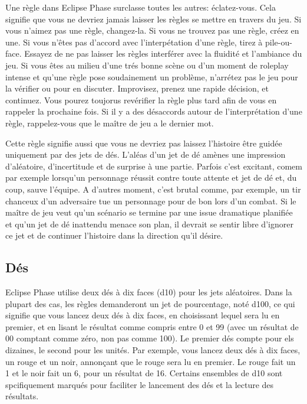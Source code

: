 Une règle dans Eclipse Phase surclasse toutes les autres: éclatez-vous. Cela signifie que vous ne devriez jamais laisser les règles se mettre en travers du jeu. Si vous n'aimez pas une règle, changez-la. Si vous ne trouvez pas une règle, créez en une. Si vous n'êtes pas d'accord avec l'interpétation d'une règle, tirez à pile-ou-face. Essayez de ne pas laisser les règles interférer avec la fluidité et l'ambiance du jeu. Si vous êtes au milieu d'une trés bonne scène ou d'un moment de roleplay intense et qu'une règle pose soudainement un problème, n'arrétez pas le jeu pour la vérifier ou pour en discuter. Improvisez, prenez une rapide décision, et continuez. Vous pourez toujorus revérifier la règle plus tard afin de vous en rappeler la prochaine fois. Si il y a des désaccords autour de l'interprétation d'une règle, rappelez-vous que le maître de jeu a le dernier mot. 

Cette règle signifie aussi que vous ne devriez pas laissez l'histoire être guidée uniquement par des jets de dés. L'aléas d'un jet de dé amènes une impression d'aléatoire, d'incertitude et de surprise à une partie. Parfois c'est excitant, comem par exemple lorsqu'un personnage réussit contre toute attente et jet de dé et, du coup, sauve l'équipe. A d'autres moment, c'est brutal comme, par exemple, un tir chanceux d'un adversaire tue un personnage pour de bon lors d'un combat. Si le maître de jeu veut qu'un scénario se termine par une issue dramatique planifiée et qu'un jet de dé inattendu menace son plan, il devrait se sentir libre d'ignorer ce jet et de continuer l'histoire dans la direction qu'il désire. 

\subsection{Dés} \label{sec:dice-1} 

Eclipse Phase utilise deux dés à dix faces (d10) pour les jets aléatoires. Dans la plupart des cas, les règles demanderont un jet de pourcentage, noté d100, ce qui signifie que vous lancez deux dés à dix faces, en choisissant lequel sera lu en premier, et en lisant le résultat comme compris entre 0 et 99 (avec un résultat de 00 comptant comme zéro, non pas comme 100). Le premier dés compte pour els dizaines, le second pour les unités. Par exemple, vous lancez deux dés à dix faces, un rouge et un noir, annonçant que le rouge sera lu en premier. Le rouge fait un 1 et le noir fait un 6, pour un résultat de 16. Certains ensembles de d10 sont spcifiquement marqués pour faciliter le lancement des dés et la lecture des résultats. 

